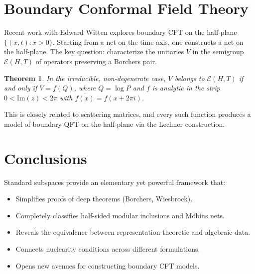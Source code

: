 \documentclass[11pt,a4paper]{article}
\newtheorem{theorem}{Theorem}[section]
\begin{document}
\section{Boundary Conformal Field Theory}

Recent work with Edward Witten explores boundary CFT on the half-plane
$\{(x,t) : x > 0\}$. Starting from a net on the time axis, one constructs
a net on the half-plane. The key question: characterize the unitaries $V$
in the semigroup $\mathcal{E}(H,T)$ of operators preserving a Borchers pair.

\begin{theorem}
In the irreducible, non-degenerate case, $V$ belongs to $\mathcal{E}(H,T)$
if and only if $V = f(Q)$, where $Q = \log P$ and $f$ is analytic in
the strip $0 < \mathrm{Im}(z) < 2\pi$ with
$\overline{f(x)} = f(x + 2\pi i)$.
\end{theorem}

This is closely related to scattering matrices, and every such function
produces a model of boundary QFT on the half-plane via the Lechner
construction.

\section{Conclusions}

Standard subspaces provide an elementary yet powerful framework that:
\begin{itemize}[nosep]
  \item Simplifies proofs of deep theorems (Borchers, Wiesbrock).
  \item Completely classifies half-sided modular inclusions and M\"obius nets.
  \item Reveals the equivalence between representation-theoretic and
        algebraic data.
  \item Connects nuclearity conditions across different formulations.
  \item Opens new avenues for constructing boundary CFT models.
\end{itemize}
\end{document}
